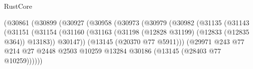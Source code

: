 \begin{lexlean}{RustCore}
\begin{coremodule}
                                                      (@30861
                                                        (@30899
                                                          (@30927
                                                            (@30958
                                                              (@30973
                                                                (@30979
                                                                  (@30982
                                                                    (@31135
                                                                      (@31143
                                                                        (@31151
                                                                          (@31154
                                                                            (@31160
                                                                              (@31163
                                                                                (@31198
                                                                                  (@12828 @31199)
                                                                                  (@12833
                                                                                    (@12835 @364))
                                                                                  @13183))
                                                                              @30147))
                                                                          (@13145
                                                                            (@20370 @77 @5911)))
                                                                        (@29971
                                                                          @243
                                                                          @77
                                                                          @214
                                                                          @27
                                                                          @2448
                                                                          @2503
                                                                          @10259
                                                                          @13284
                                                                          @30186
                                                                          (@13145
                                                                            (@28403 @77 @10259))))))

\end{coremodule}
\end{lexlean}
